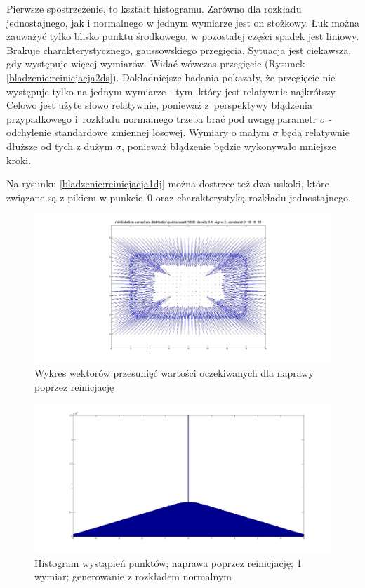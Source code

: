 \documentclass{mini}
\begin{document}
Pierwsze spostrzeżenie, to kształt histogramu. Zarówno dla rozkładu jednostajnego, jak i normalnego w jednym wymiarze jest on stożkowy. Łuk można zauważyć tylko blisko punktu środkowego, w pozostałej części spadek jest liniowy. Brakuje charakterystycznego, gaussowskiego przegięcia. Sytuacja jest ciekawsza, gdy występuje więcej wymiarów. Widać wówczas przegięcie (Rysunek \ref{bladzenie:reinicjacja2ds}). Dokładniejsze badania pokazały, że przegięcie nie występuje tylko na jednym wymiarze - tym, który jest relatywnie najkrótszy. Celowo jest użyte słowo relatywnie, ponieważ z~perspektywy błądzenia przypadkowego i~rozkładu normalnego trzeba brać pod uwagę parametr $\sigma$ - odchylenie standardowe zmiennej losowej. Wymiary o małym $\sigma$ będą relatywnie dłuższe od tych z dużym $\sigma$, ponieważ błądzenie będzie wykonywało mniejsze kroki.

Na rysunku \ref{bladzenie:reinicjacja1dj} można dostrzec też dwa uskoki, które związane są z pikiem w punkcie~$0$ oraz charakterystyką rozkładu jednostajnego.

\begin{figure}[H]
\centering
\includegraphics[width=\textwidth]{reinitialization2dprzesuniecie}
\caption{Wykres wektorów przesunięć wartości oczekiwanych dla naprawy poprzez reinicjację}
\end{figure}

\begin{figure}[H]
\centering
\includegraphics[width=\textwidth]{ri_n_20M_1__5_5}
\caption{Histogram wystąpień punktów; naprawa poprzez reinicjację; 1 wymiar; generowanie z rozkładem normalnym}
\end{figure}
\end{document}
